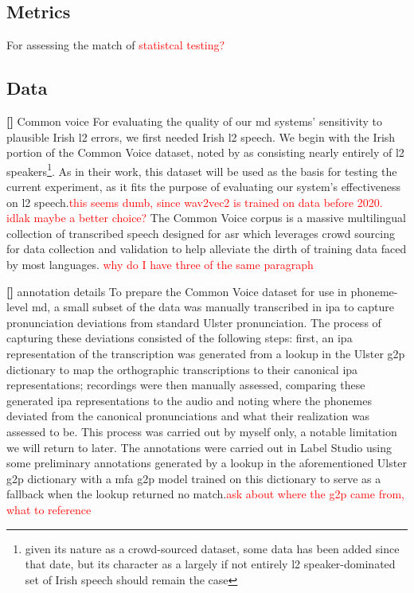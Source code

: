 \documentclass[thesis]{cluu}
\newcounter{paranum}
\newcommand{\numberedparagraph}{\par\refstepcounter{paranum}\textbf{[\theparanum] }}
\newcommand{\todo}[1]{\textcolor{red}{#1}}
\begin{document}
\subsection{Metrics}
For assessing the match of 
\todo{statistcal testing?}

\subsection{Data}
\numberedparagraph{Common voice}
For evaluating the quality of our \gls{md} systems' sensitivity to plausible Irish \gls{l2} errors, we first needed Irish \gls{l2} speech. We begin with the Irish portion of the Common Voice dataset\textcite{ardilaCommonVoiceMassivelyMultilingual2020}, noted by \textcite{lonerganAutomaticSpeechRecognition} as consisting nearly entirely of \gls{l2} speakers\footnote{given its nature as a crowd-sourced dataset, some data has been added since that date, but its character as a largely if not entirely \gls{l2} speaker-dominated set of Irish speech should remain the case}. As in their work, this dataset will be used as the basis for testing the current experiment, as it fits the purpose of evaluating our system's effectiveness on \gls{l2} speech.\todo{this seems dumb, since wav2vec2 is trained on data before 2020. idlak maybe a better choice?} The Common Voice corpus is a massive multilingual collection of transcribed speech designed for \gls{asr} which leverages crowd sourcing for data collection and validation to help alleviate the dirth of training data faced by most languages. \todo{why do I have three of the same paragraph}

\numberedparagraph{annotation details} 
To prepare the Common Voice dataset for use in phoneme-level \gls{md}, a small subset of the data was manually transcribed in \gls{ipa} to capture pronunciation deviations from standard Ulster pronunciation. The process of capturing these deviations consisted of the following steps: first, an \gls{ipa} representation of the transcription was generated from a lookup in the Ulster \gls{g2p} dictionary to map the orthographic transcriptions to their canonical \gls{ipa} representations; recordings were then manually assessed, comparing these generated \gls{ipa} representations to the audio and noting where the phonemes deviated from the canonical pronunciations and what their realization was assessed to be. This process was carried out by myself only, a notable limitation we will return to later. The annotations were carried out in Label Studio using some preliminary annotations generated by a lookup in the aforementioned Ulster \gls{g2p} dictionary with a \gls{mfa} \gls{g2p} model trained on this dictionary to serve as a fallback when the lookup returned no match.\todo{ask about where the g2p came from, what to reference} 
\end{document}

